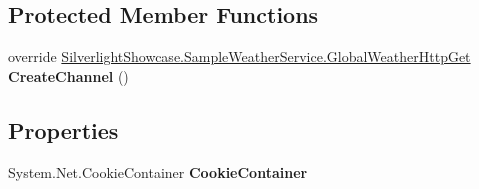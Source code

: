 \subsection*{Protected Member Functions}
\begin{DoxyCompactItemize}
\item 
\hypertarget{class_silverlight_showcase_1_1_sample_weather_service_1_1_global_weather_http_get_client_a9a2bc05bbb229422e98ff176b0c9be51}{
override \hyperlink{interface_silverlight_showcase_1_1_sample_weather_service_1_1_global_weather_http_get}{SilverlightShowcase.SampleWeatherService.GlobalWeatherHttpGet} {\bfseries CreateChannel} ()}
\label{class_silverlight_showcase_1_1_sample_weather_service_1_1_global_weather_http_get_client_a9a2bc05bbb229422e98ff176b0c9be51}

\end{DoxyCompactItemize}
\subsection*{Properties}
\begin{DoxyCompactItemize}
\item 
\hypertarget{class_silverlight_showcase_1_1_sample_weather_service_1_1_global_weather_http_get_client_a0f89e3ee35699bd9dad108723d0c5008}{
System.Net.CookieContainer {\bfseries CookieContainer}}
\label{class_silverlight_showcase_1_1_sample_weather_service_1_1_global_weather_http_get_client_a0f89e3ee35699bd9dad108723d0c5008}

\end{DoxyCompactItemize}
